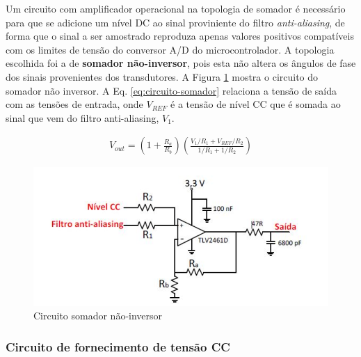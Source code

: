 Um circuito com amplificador operacional na topologia de somador é necessário para que se adicione um nível DC ao sinal proviniente do filtro \textit{anti-aliasing}, de forma que o sinal a ser amostrado reproduza apenas valores positivos compatíveis com os limites de tensão do conversor A/D do microcontrolador. 
A topologia escolhida foi a de \textbf{somador não-inversor}, pois esta não altera os ângulos de fase dos sinais provenientes dos transdutores. A Figura \ref{fig:somador-ninversor} mostra o circuito do somador não inversor. A Eq. \ref{eq:circuito-somador} relaciona a tensão de saída com as tensões de entrada, onde $V_{REF}$ é a tensão de nível CC que é somada ao sinal que vem do filtro anti-aliasing, $V_1$.

\begin{align}
	V_{out} = \left(1+\frac{R_a}{R_b}\right)\left(\frac{V_1/R_1 + V_{REF}/R_2}{1/R_1 + 1/R_2}\right)\label{eq:circuito-somador}
\end{align}

\begin{figure}[!hbt]
	\begin{center}
		\includegraphics[scale=0.7]{figuras/somador-ninversor.JPG}
		\caption{Circuito somador não-inversor}
		\label{fig:somador-ninversor}
	\end{center}
\end{figure}

\subsubsection{Circuito de fornecimento de tensão CC}


